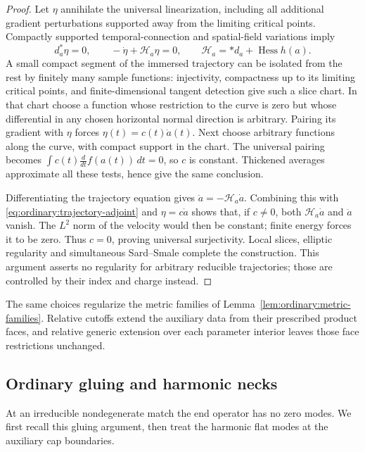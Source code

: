 \begin{proof}
Let $\eta$ annihilate the universal linearization, including all
additional gradient perturbations supported away from the limiting
critical points.  Compactly supported temporal-connection and
spatial-field variations imply
\begin{equation}\label{eq:ordinary:trajectory-adjoint}
 d_a^*\eta=0,
 \qquad -\dot\eta+\mathcal H_a\eta=0,
 \qquad \mathcal H_a=*d_a+\operatorname{Hess}h(a).
\end{equation}
A small compact segment of the immersed trajectory can be isolated
from the rest by finitely many sample functions: injectivity,
compactness up to its limiting critical points, and
finite-dimensional tangent detection give such a slice chart.
In that chart choose a function whose restriction to the curve is
zero but whose differential in any chosen horizontal normal
direction is arbitrary.  Pairing its gradient with $\eta$ forces
$\eta(t)=c(t)\dot a(t)$.  Next choose arbitrary functions along the
curve, with compact support in the chart.  The universal pairing
becomes $\int c(t)\frac{d}{dt}f(a(t))\,dt=0$, so $c$ is constant.
Thickened averages approximate all these tests, hence give the
same conclusion.

Differentiating the trajectory equation gives
$\ddot a=-\mathcal H_a\dot a$.  Combining this with
\eqref{eq:ordinary:trajectory-adjoint} and $\eta=c\dot a$ shows that,
if $c\ne0$, both $\mathcal H_a\dot a$ and $\ddot a$ vanish.  The
$L^2$ norm of the velocity would then be constant; finite energy
forces it to be zero.  Thus $c=0$, proving universal surjectivity.
Local slices, elliptic regularity and simultaneous Sard--Smale
complete the construction.  This argument asserts no regularity
for arbitrary reducible trajectories; those are controlled by
their index and charge instead.
\end{proof}

The same choices regularize the metric families of
Lemma~\ref{lem:ordinary:metric-families}.  Relative cutoffs extend the
auxiliary data from their prescribed product faces, and relative
generic extension over each parameter interior leaves those face
restrictions unchanged.

\subsection{Ordinary gluing and harmonic necks}

At an irreducible nondegenerate match the end operator has no zero
modes.  We first recall this gluing argument, then treat the harmonic
flat modes at the auxiliary cap boundaries.

